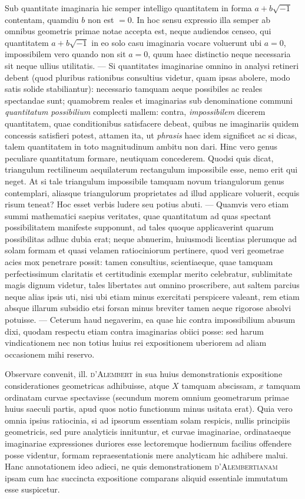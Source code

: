 \expandafter\def\csname HistoricalNoteText1\endcsname{Sub quantitate imaginaria hic semper intelligo quantitatem in forma $a+b\sqrt{-1}$ contentam, quamdiu $b$ non est $=0$. In hoc sensu expressio illa semper ab omnibus geometris primae notae accepta est, neque audiendos censeo, qui quantitatem $a+b\sqrt{-1}$ in eo solo casu imaginaria vocare voluerunt ubi $a=0$,
impossibilem vero quando non sit $a=0$, quum haec distinctio neque necessaria sit neque ullius utilitatis. ---
Si quantitates imaginariae omnino in analysi retineri debent (quod pluribus rationibus consultius videtur, quam
ipsas abolere, modo satis solide stabiliantur): necessario tamquam aeque possibiles ac reales spectandae sunt;
quamobrem reales et imaginarias sub denominatione communi \textit{quantitatum possibilium} complecti mallem: contra, \textit{impossibilem} dicerem quantitatem, quae conditionibus satisfacere debeat, quibus ne imaginariis quidem
concessis satisfieri potest, attamen ita, ut \textit{phrasis} haec idem significet ac si dicas, talem quantitatem in toto
magnitudinum ambitu non dari. Hinc vero genus peculiare quantitatum formare, neutiquam concederem.
Quodsi quis dicat, triangulum rectilineum aequilaterum rectangulum impossibile esse, nemo erit qui neget.
At si tale triangulum impossibile tamquam novum triangulorum genus contemplari, aliasque triangulorum proprietates ad illud applicare voluerit, ecquis risum teneat? Hoc esset verbis ludere seu potius abuti. --- Quamvis vero etiam summi mathematici saepius veritates, quae quantitatum ad quas spectant possibilitatem manifeste supponunt, ad tales quoque applicaverint quarum possibilitas adhuc dubia erat; neque abnuerim, huiusmodi licentias plerumque ad solam formam et quasi velamen ratiociniorum pertinere, quod veri geometrae
acies mox penetrare possit: tamen consultius, scientiaeque, quae tamquam perfectissimum claritatis et certitudinis exemplar merito celebratur, sublimitate magis dignum videtur, tales libertates aut omnino proscribere,
aut saltem parcius neque alias ipsis uti, nisi ubi etiam minus exercitati perspicere valeant, rem etiam absque
illarum subsidio etsi forsan minus breviter tamen aeque rigorose absolvi potuisse. --- Ceterum haud negaverim,
ea quae hic contra impossibilium abusum dixi, quodam respectu etiam contra imaginarias obiici posse: sed harum vindicationem nec non totius huius rei expositionem uberiorem ad aliam occasionem mihi reservo.}

\expandafter\def\csname HistoricalNoteText2\endcsname{Observare convenit, ill. \textsc{d'Alembert} in sua huius demonstrationis expositione considerationes geometricas adhibuisse, atque $X$ tamquam abscissam, $x$ tamquam ordinatam curvae spectavisse (secundum morem
omnium geometrarum primae huius saeculi partis, apud quos notio functionum minus usitata erat). Quia vero
omnia ipsius ratiocinia, si ad ipsorum essentiam solam respicis, nullis principiis geometricis, sed pure analyticis innituntur, et curvae imaginariae, ordinataeque imaginariae expressiones duriores esse lectoremque hodiernum facilius offendere posse videntur, formam repraesentationis mere analyticam hic adhibere malui. Hanc
annotationem ideo adieci, ne quis demonstrationem \textsc{d'Alembertianam} ipsam cum hac succincta expositione comparans aliquid essentiale immutatum esse suspicetur.}

